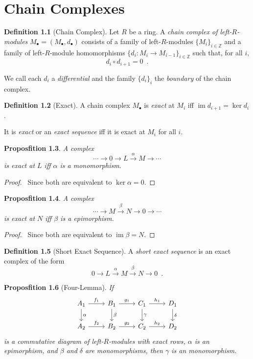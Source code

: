 \documentclass{book}
\let\qed\relax
\newtheorem{prop}{Proposfition}[chapter]
\theoremstyle{definition}
\newtheorem{df}[prop]{Definition}
\newcommand{\im}{\ensuremath{\operatorname{im}}}
\begin{document}
\chapter{Chain Complexes}

\begin{df}[Chain Complex]
Let $R$ be a ring. A \emph{chain complex of left-$R$-modules} $M_\bullet = (M_\bullet, d_\bullet)$ consists of a family of left-$R$-modules $\{ M_i \}_{i \in \mathbb{Z}}$ and a family of left-$R$-module homomorphisms $\{ d_i : M_i \rightarrow M_{i-1} \}_{i \in \mathbb{Z}}$ such that, for all $i$,
\[ d_i \circ d_{i+1} = 0 \enspace . \]

We call each $d_i$ a \emph{differential} and the family $\{d_i\}_i$ the \emph{boundary} of the chain complex.
\end{df}

\begin{df}[Exact]
A chain complex $M_\bullet$ is \emph{exact} at $M_i$ iff $\im d_{i+1} = \ker d_i$.

It is \emph{exact} or an \emph{exact sequence} iff it is exact at $M_i$ for all $i$.
\end{df}

\begin{prop}
A complex
\[ \cdots \rightarrow 0 \rightarrow L \stackrel{\alpha}{\rightarrow} M \rightarrow \cdots \]
is exact at $L$ iff $\alpha$ is a monomorphism.
\end{prop}

\begin{proof}
\pf\ Since both are equivalent to $\ker \alpha = 0$. \qed
\end{proof}

\begin{prop}
A complex
\[ \cdots \rightarrow M \stackrel{\beta}{\rightarrow} N \rightarrow 0 \rightarrow \cdots \]
is exact at $N$ iff $\beta$ is a epimorphism.
\end{prop}

\begin{proof}
\pf\ Since both are equivalent to $\im \beta = N$. \qed
\end{proof}

\begin{df}[Short Exact Sequence]
A \emph{short exact sequence} is an exact complex of the form
\[ 0 \rightarrow L \stackrel{\alpha}{\rightarrow} M \stackrel{\beta}{\rightarrow} N \rightarrow 0 \enspace . \]
\end{df}

\begin{prop}[Four-Lemma]
If
\[ \begin{tikzcd}
A_1 \arrow[r,"f_1"] \arrow[d,"\alpha"] & B_1 \arrow[r,"g_1"] \arrow[d,"\beta"] & C_1 \arrow[r,"h_1"] \arrow[d,"\gamma"] & D_1 \arrow[d,"\delta"] \\
A_2 \arrow[r,"f_2"] & B_2 \arrow[r,"g_2"] & C_2 \arrow[r,"h_2"] & D_2
\end{tikzcd} \]
is a commutative diagram of left-$R$-modules with exact rows, $\alpha$ is an epimorphism, and $\beta$ and $\delta$ are monomorphisms, then $\gamma$ is an monomorphism.
\end{prop}
\end{document}
